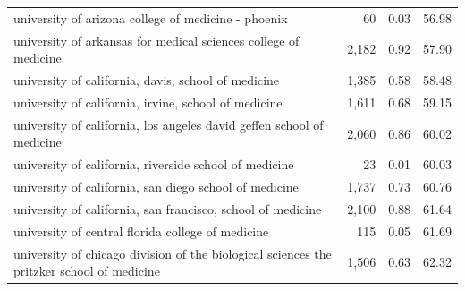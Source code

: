 \begin{table}[!h]
\begin{tabular}{llll}
\multicolumn{1}{l}{\hspace{1em}university of arizona college of medicine - phoenix} &
  \multicolumn{1}{r}{60} &
  \multicolumn{1}{r}{0.03} &
  \multicolumn{1}{r}{56.98} \\
\multicolumn{1}{l}{\hspace{1em}university of arkansas for medical sciences college of medicine} &
  \multicolumn{1}{r}{2,182} &
  \multicolumn{1}{r}{0.92} &
  \multicolumn{1}{r}{57.90} \\
\multicolumn{1}{l}{\hspace{1em}university of california, davis, school of medicine} &
  \multicolumn{1}{r}{1,385} &
  \multicolumn{1}{r}{0.58} &
  \multicolumn{1}{r}{58.48} \\
\multicolumn{1}{l}{\hspace{1em}university of california, irvine, school of medicine} &
  \multicolumn{1}{r}{1,611} &
  \multicolumn{1}{r}{0.68} &
  \multicolumn{1}{r}{59.15} \\
\multicolumn{1}{l}{\hspace{1em}university of california, los angeles david geffen school of medicine} &
  \multicolumn{1}{r}{2,060} &
  \multicolumn{1}{r}{0.86} &
  \multicolumn{1}{r}{60.02} \\
\multicolumn{1}{l}{\hspace{1em}university of california, riverside school of medicine} &
  \multicolumn{1}{r}{23} &
  \multicolumn{1}{r}{0.01} &
  \multicolumn{1}{r}{60.03} \\
\multicolumn{1}{l}{\hspace{1em}university of california, san diego school of medicine} &
  \multicolumn{1}{r}{1,737} &
  \multicolumn{1}{r}{0.73} &
  \multicolumn{1}{r}{60.76} \\
\multicolumn{1}{l}{\hspace{1em}university of california, san francisco, school of medicine} &
  \multicolumn{1}{r}{2,100} &
  \multicolumn{1}{r}{0.88} &
  \multicolumn{1}{r}{61.64} \\
\multicolumn{1}{l}{\hspace{1em}university of central florida college of medicine} &
  \multicolumn{1}{r}{115} &
  \multicolumn{1}{r}{0.05} &
  \multicolumn{1}{r}{61.69} \\
\multicolumn{1}{l}{\hspace{1em}university of chicago division of the biological sciences the pritzker school of medicine} &
  \multicolumn{1}{r}{1,506} &
  \multicolumn{1}{r}{0.63} &
  \multicolumn{1}{r}{62.32} \\

\end{tabular}
\end{table}

